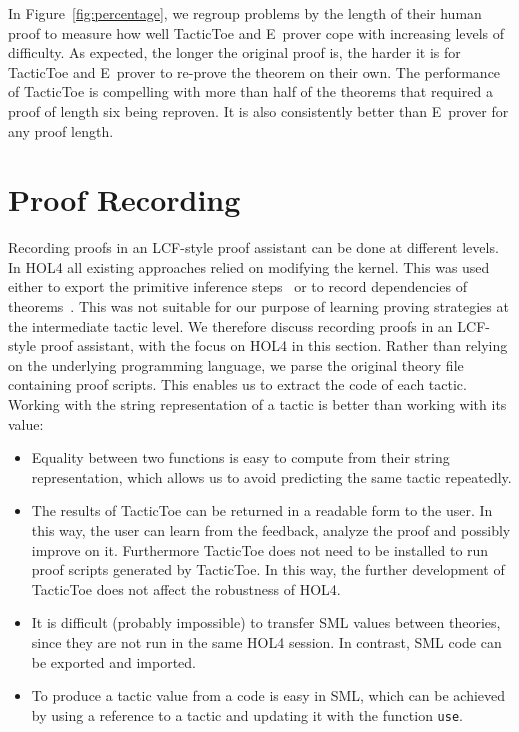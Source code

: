 \documentclass[runningheads,a4paper,draft]{svjour3}
\def\holfour{\textsf{HOL4}\xspace}
\def\eprover{\textsf{E~prover}\xspace}
\def\sml{\textsf{SML}\xspace}
\def\tactictoe{\textsf{TacticToe}\xspace}
\begin{document}
In Figure~\ref{fig:percentage}, we regroup problems by the length of their 
human proof to measure how well \tactictoe and \eprover cope with increasing 
levels 
of difficulty. As expected, the longer the original proof is, the harder it is
for \tactictoe and \eprover to re-prove the theorem on their own.
The performance of \tactictoe is compelling with more than half of the theorems
that required a proof of length six being reproven. It is also consistently
better than \eprover for any proof length.


\section{Proof Recording}\label{sec:recording}
Recording proofs in an LCF-style proof assistant can be done at different
levels.
In \holfour all existing approaches relied on modifying the kernel. This was
used
either to export the primitive inference
steps~\cite{Wong95recordingand,DBLP:conf/itp/KumarH12}
or to record dependencies of theorems~\cite{tgck-cpp15}. This was not suitable
for our
purpose of learning proving strategies at the intermediate tactic level. We
therefore
discuss recording proofs in an LCF-style proof assistant, with the focus on
\holfour
in this section.
%
Rather than relying on the underlying programming language, we parse the
original theory file containing proof scripts. This enables us to extract the
code of each tactic.
Working with the string representation of a tactic is better than working with
its value:
\begin{itemize}
\item Equality between two functions is easy to compute from
their string representation, which allows us to avoid
predicting the same tactic repeatedly.
\item
The
results of
\tactictoe can be returned in a readable form to the user. In this way, the
user can learn from the feedback, analyze the proof and possibly improve on it.
Furthermore \tactictoe does not need to be installed to run
proof scripts generated by \tactictoe. In this way, the further development of
\tactictoe does not affect the robustness of \holfour.
\item
It is difficult (probably impossible) to transfer \sml values
between theories, since they are not run in the same \holfour session. In contrast,
\sml code can be exported and imported.
\item To produce a tactic value from a code is easy in \sml, which can be
achieved by using a reference to a tactic and updating it with the function
\texttt{use}.
\end{itemize}
\end{document}
